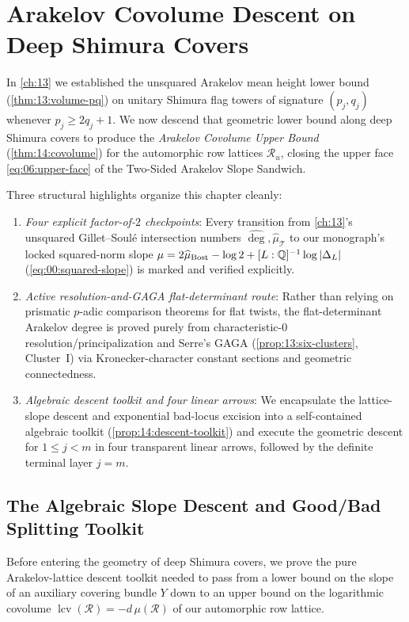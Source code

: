 \chapter{Arakelov Covolume Descent on Deep Shimura Covers}
\label{ch:14}

In \cref{ch:13} we established the unsquared Arakelov mean height lower bound (\cref{thm:13:volume-pq}) on unitary Shimura flag towers of signature $(p_j, q_j)$ whenever $p_j \ge 2q_j + 1$. We now descend that geometric lower bound along deep Shimura covers to produce the \emph{Arakelov Covolume Upper Bound} (\cref{thm:14:covolume}) for the automorphic row lattices $\mathcal{R}_u$, closing the upper face \eqref{eq:06:upper-face} of the Two-Sided Arakelov Slope Sandwich.

Three structural highlights organize this chapter cleanly:
\begin{enumerate}[label=(\roman*)]
\item \emph{Four explicit factor-of-$2$ checkpoints}: Every transition from \cref{ch:13}'s unsquared Gillet--Soul\'e intersection numbers $\widehat{\deg}, \widehat{\mu}_{\mathcal{T}}$ to our monograph's locked squared-norm slope $\mu = 2\widehat{\mu}_{\mathrm{Bost}} - \log 2 + [L:\mathbb{Q}]^{-1}\log|\Delta_L|$ (\eqref{eq:00:squared-slope}) is marked and verified explicitly.
\item \emph{Active resolution-and-GAGA flat-determinant route}: Rather than relying on prismatic $p$-adic comparison theorems for flat twists, the flat-determinant Arakelov degree is proved purely from characteristic-$0$ resolution/principalization and Serre's GAGA (\cref{prop:13:six-clusters}, Cluster~I) via Kronecker-character constant sections and geometric connectedness.
\item \emph{Algebraic descent toolkit and four linear arrows}: We encapsulate the lattice-slope descent and exponential bad-locus excision into a self-contained algebraic toolkit (\cref{prop:14:descent-toolkit}) and execute the geometric descent for $1 \le j < m$ in four transparent linear arrows, followed by the definite terminal layer $j = m$.
\end{enumerate}

\section{The Algebraic Slope Descent and Good/Bad Splitting Toolkit}
\label{sec:14:algebraic-toolkit}

Before entering the geometry of deep Shimura covers, we prove the pure Arakelov-lattice descent toolkit needed to pass from a lower bound on the slope of an auxiliary covering bundle $Y$ down to an upper bound on the logarithmic covolume $\operatorname{lcv}(\mathcal{R}) = -d\,\mu(\mathcal{R})$ of our automorphic row lattice.

